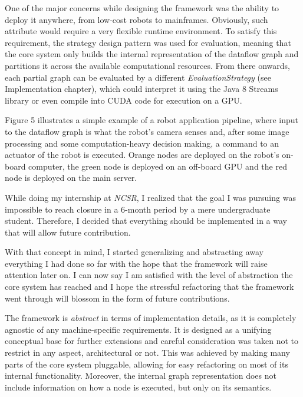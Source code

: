 \documentclass{dithesis}
\begin{document}


One of the major concerns while designing the framework was the ability to deploy it anywhere, from low-cost robots to mainframes. Obviously, such attribute would require a very flexible runtime environment. To satisfy this requirement, the strategy design pattern was used for evaluation, meaning that the core system only builds the internal representation of the dataflow graph and partitions it across the available computational resources. From there onwards, each partial graph can be evaluated by a different \textit{EvaluationStrategy} (see Implementation chapter), which could interpret it using the Java 8 Streams library or even compile into CUDA code for execution on a GPU.

Figure 5 illustrates a simple example of a robot application pipeline, where input to the dataflow graph is what the robot's camera senses and, after some image processing and some computation-heavy decision making, a command to an actuator of the robot is executed. Orange nodes are deployed on the robot's on-board computer, the green node is deployed on an off-board GPU and the red node is deployed on the main server.



While doing my internship at \textit{NCSR}, I realized that the goal I was pursuing was impossible to reach closure in a 6-month period by a mere undergraduate student. Therefore, I decided that everything should be implemented in a way that will allow future contribution. 

With that concept in mind, I started generalizing and abstracting away everything I had done so far with the hope that the framework will raise attention later on. I can now say I am satisfied with the level of abstraction the core system has reached and I hope the stressful refactoring that the framework went through will blossom in the form of future contributions.


The framework is \textit{abstract} in terms of implementation details, as it is completely agnostic of any machine-specific requirements. It is designed as a unifying conceptual base for further extensions and careful consideration was taken not to restrict in any aspect, architectural or not. This was achieved by making many parts of the core system pluggable, allowing for easy refactoring on most of its internal functionality. Moreover, the internal graph representation does not include information on how a node is executed, but only on its semantics.
\end{document}
